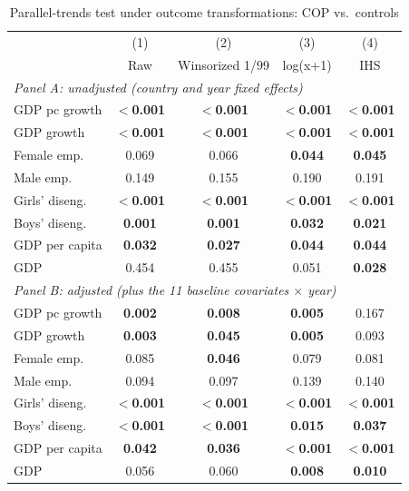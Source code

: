 \begin{table}[htbp]
\centering
\caption{Parallel-trends test under outcome transformations: COP vs.\ controls}
\label{tab:crown_pretrends_transform_cop}
\begin{tabular}{lcccc}
\toprule
 & (1) & (2) & (3) & (4) \\
 & Raw & Winsorized 1/99 & log(x+1) & IHS \\
\midrule
\multicolumn{5}{l}{\textit{Panel A: unadjusted (country and year fixed effects)}} \\
GDP pc growth & \textbf{$<$0.001} & \textbf{$<$0.001} & \textbf{$<$0.001} & \textbf{$<$0.001} \\
GDP growth & \textbf{$<$0.001} & \textbf{$<$0.001} & \textbf{$<$0.001} & \textbf{$<$0.001} \\
Female emp. & 0.069 & 0.066 & \textbf{0.044} & \textbf{0.045} \\
Male emp. & 0.149 & 0.155 & 0.190 & 0.191 \\
Girls' diseng. & \textbf{$<$0.001} & \textbf{$<$0.001} & \textbf{$<$0.001} & \textbf{$<$0.001} \\
Boys' diseng. & \textbf{0.001} & \textbf{0.001} & \textbf{0.032} & \textbf{0.021} \\
GDP per capita & \textbf{0.032} & \textbf{0.027} & \textbf{0.044} & \textbf{0.044} \\
GDP & 0.454 & 0.455 & 0.051 & \textbf{0.028} \\
\midrule
\multicolumn{5}{l}{\textit{Panel B: adjusted (plus the 11 baseline covariates $\times$ year)}} \\
GDP pc growth & \textbf{0.002} & \textbf{0.008} & \textbf{0.005} & 0.167 \\
GDP growth & \textbf{0.003} & \textbf{0.045} & \textbf{0.005} & 0.093 \\
Female emp. & 0.085 & \textbf{0.046} & 0.079 & 0.081 \\
Male emp. & 0.094 & 0.097 & 0.139 & 0.140 \\
Girls' diseng. & \textbf{$<$0.001} & \textbf{$<$0.001} & \textbf{$<$0.001} & \textbf{$<$0.001} \\
Boys' diseng. & \textbf{$<$0.001} & \textbf{$<$0.001} & \textbf{0.015} & \textbf{0.037} \\
GDP per capita & \textbf{0.042} & \textbf{0.036} & \textbf{$<$0.001} & \textbf{$<$0.001} \\
GDP & 0.056 & 0.060 & \textbf{0.008} & \textbf{0.010} \\
\bottomrule
\end{tabular}

\end{table}
